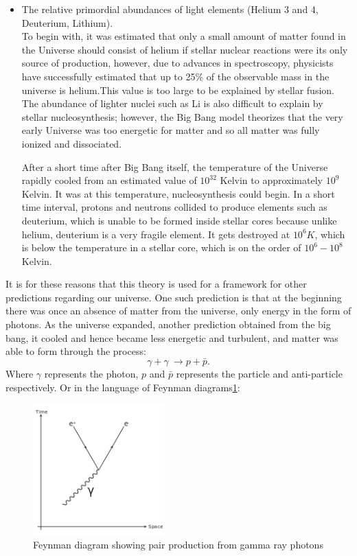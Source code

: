 \begin{itemize}
\item The relative primordial abundances of light elements (Helium 3 and 4, Deuterium, Lithium). \\ To begin with, it was estimated that only a small amount of matter found in the Universe should consist of helium if stellar nuclear reactions were its only source of production, however, due to advances in spectroscopy, physicists have successfully estimated that up to 25\% of the observable mass in the universe is helium.This value is too large to be explained by stellar fusion. \cite{1} \cite{10}  The abundance of lighter nuclei such as Li is also difficult to explain by stellar nucleosynthesis; however, the Big Bang model theorizes that the very early Universe was too energetic for matter and so all matter was fully ionized and dissociated. \cite{1}
\par After a short time after Big Bang itself, the temperature of the Universe rapidly cooled from an estimated value of $ 10^{32}$ Kelvin to approximately $10^{9}$ Kelvin. It was at this temperature, nucleosynthesis could begin. In a short time interval, protons and neutrons collided to produce elements such as deuterium, which is unable to be formed inside stellar cores because unlike helium, deuterium is a very fragile element. It gets destroyed at $10^{6} K$, which is below the temperature in a stellar core, which is on the order of $10^{6}-10^{8}$ Kelvin. \cite{10}
\end{itemize}
It is for these reasons that this theory is used for a framework for other predictions regarding our universe. One such prediction is that at the beginning there was once an absence of matter from the universe, only energy in the form of photons. As the universe expanded, another prediction obtained from the big bang, it cooled and hence became less energetic and turbulent, and matter was able to form through the process: \cite{5} 
\begin{equation}
\gamma + \gamma \ \rightarrow p+ \bar{p}.
\end{equation}
Where $ \gamma $ represents the photon, $p$ and $\bar{p}$ represents the particle and anti-particle respectively. Or in the language of Feynman diagrams\cref{fym}: 
\begin{figure}[hbt!]\label{fym}
\begin{center}
\includegraphics[width=0.451\textwidth]{figs/p.png}
\caption{Feynman diagram showing pair production from gamma ray photons}
\end{center}
\end{figure}
